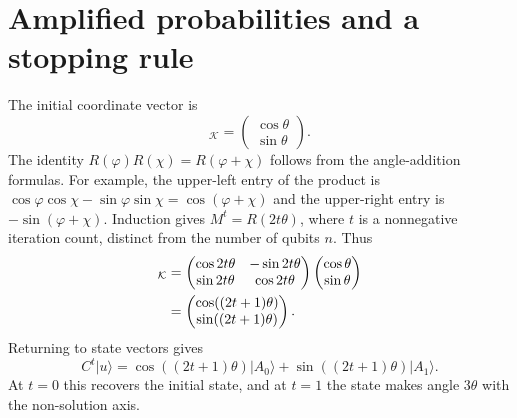 \documentclass[11pt,oneside,openany]{book}
\providecommand{\ket}{}
\renewcommand{\ket}[1]{\lvert #1\rangle}
\theoremstyle{definition}
\begin{document}
\section{Amplified probabilities and a stopping rule}

The initial coordinate vector is
\begin{equation}
 [\ket u]_{\mathcal K}=\begin{pmatrix}\cos\theta\\\sin\theta\end{pmatrix}.
\end{equation}
The identity $R(\varphi)R(\chi)=R(\varphi+\chi)$ follows from the angle-addition formulas. For example, the upper-left entry of the product is $\cos\varphi\cos\chi-\sin\varphi\sin\chi=\cos(\varphi+\chi)$ and the upper-right entry is $-\sin(\varphi+\chi)$. Induction gives $M^t=R(2t\theta)$, where $t$ is a nonnegative iteration count, distinct from the number of qubits $n$. Thus
\begin{align}
 [C^t\ket u]_{\mathcal K}
 &=\begin{pmatrix}\cos2t\theta&-\sin2t\theta\\
                  \sin2t\theta&\cos2t\theta\end{pmatrix}
   \begin{pmatrix}\cos\theta\\\sin\theta\end{pmatrix}\notag\\
 &=\begin{pmatrix}\cos((2t+1)\theta)\\\sin((2t+1)\theta)\end{pmatrix}.
\end{align}
Returning to state vectors gives
\begin{equation}
 C^t\ket u=\cos((2t+1)\theta)\ket{A_0}
 +\sin((2t+1)\theta)\ket{A_1}.
 \label{eq:search-state-t}
\end{equation}
At $t=0$ this recovers the initial state, and at $t=1$ the state makes angle $3\theta$ with the non-solution axis.
\end{document}
